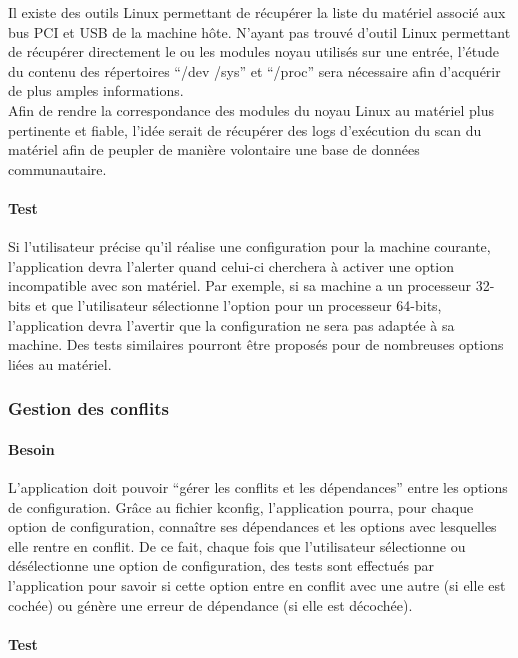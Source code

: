 \documentclass[16pts]{report}
\begin{document}
Il existe des outils Linux permettant de récupérer la liste du matériel associé
aux bus PCI et USB de la machine hôte.  N’ayant pas trouvé d’outil Linux
permettant de récupérer directement le ou les modules noyau utilisés sur une
entrée, l’étude du contenu des répertoires “/dev /sys” et “/proc” sera
nécessaire afin d’acquérir de plus amples informations.
\\

Afin de rendre la correspondance des modules du noyau Linux au matériel plus
pertinente et fiable, l’idée serait de récupérer des logs d’exécution du scan
du matériel afin de peupler de manière volontaire une base de données
communautaire.

\paragraph{Test}
\label{sssbus:Test}

Si l’utilisateur précise qu’il réalise une configuration pour la machine
courante, l’application devra l’alerter quand celui-ci cherchera à activer une
option incompatible avec son matériel. Par exemple, si sa machine a un
processeur 32-bits et que l’utilisateur sélectionne l’option pour un processeur
64-bits, l’application devra l’avertir que la configuration ne sera pas adaptée
à sa machine. Des tests similaires pourront être proposés pour de nombreuses
options liées au matériel.


\subsubsection{Gestion des conflits}
\label{sec:Gestion des conflits}
\paragraph{Besoin}
\label{sub:Besoin}

L’application doit pouvoir “gérer les conflits et les dépendances” entre les
options de configuration. Grâce au fichier kconfig, l’application pourra, pour
chaque option de configuration, connaître ses dépendances et les options avec
lesquelles elle rentre en conflit. De ce fait, chaque fois que l’utilisateur
sélectionne ou désélectionne une option de configuration, des tests sont
effectués par l'application pour savoir si cette option entre en conflit avec
une autre (si elle est cochée) ou génère une erreur de dépendance (si elle est
décochée).

\paragraph{Test}
\label{sub:Test}
\end{document}
